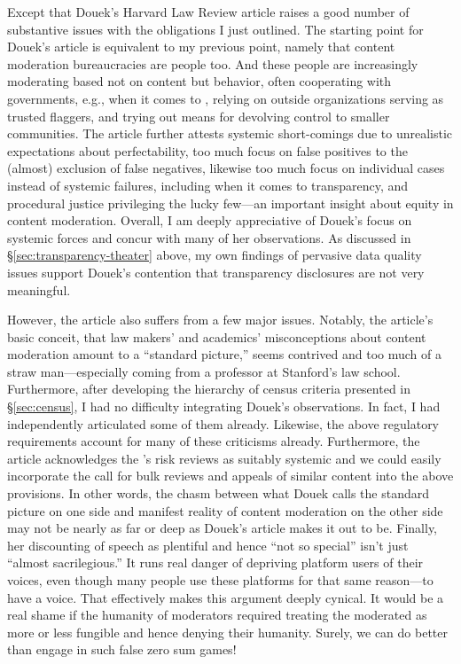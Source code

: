 Except that Douek's Harvard Law Review article raises a good number of
substantive issues with the obligations I just outlined. The starting point for
Douek's article is equivalent to my previous point, namely that content
moderation bureaucracies are people too. And these people are increasingly
moderating based not on content but behavior, often cooperating with
governments, e.g., when it comes to \CSAM, relying on outside organizations
serving as trusted flaggers, and trying out means for devolving control to
smaller communities. The article further attests systemic short-comings due to
unrealistic expectations about perfectability, too much focus on false positives
to the (almost) exclusion of false negatives, likewise too much focus on
individual cases instead of systemic failures, including when it comes to
transparency, and procedural justice privileging the lucky few---an important
insight about equity in content moderation. Overall, I am deeply appreciative of
Douek's focus on systemic forces and concur with many of her observations. As
discussed in \S\ref{sec:transparency-theater} above, my own findings of
pervasive data quality issues support Douek's contention that transparency
disclosures are not very meaningful.

However, the article also suffers from a few major issues. Notably, the
article's basic conceit, that law makers' and academics' misconceptions about
content moderation amount to a ``standard picture,'' seems contrived and too
much of a straw man---especially coming from a professor at Stanford's law
school. Furthermore, after developing the hierarchy of census criteria presented
in \S\ref{sec:census}, I had no difficulty integrating Douek's observations. In
fact, I had independently articulated some of them already. Likewise, the above
regulatory requirements account for many of these criticisms already.
Furthermore, the article acknowledges the \DSA's risk reviews as suitably
systemic and we could easily incorporate the call for bulk reviews and appeals
of similar content into the above provisions. In other words, the chasm between
what Douek calls the standard picture on one side and manifest reality of
content moderation on the other side may not be nearly as far or deep as Douek's
article makes it out to be. Finally, her discounting of speech as plentiful and
hence ``not so special'' isn't just ``almost sacrilegious.'' It runs real danger
of depriving platform users of their voices, even though many people use these
platforms for that same reason---to have a voice. That effectively makes this
argument deeply cynical. It would be a real shame if the humanity of moderators
required treating the moderated as more or less fungible and hence denying their
humanity. Surely, we can do better than engage in such false zero sum games!


